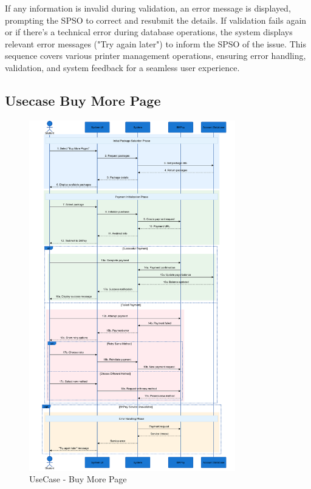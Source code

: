 If any information is invalid during validation, an error message is displayed, prompting the SPSO to correct and resubmit the details. If validation fails again or if there's a technical error during database operations, the system displays relevant error messages ("Try again later") to inform the SPSO of the issue. This sequence covers various printer management operations, ensuring error handling, validation, and system feedback for a seamless user experience.


\subsection{Usecase Buy More Page}

\begin{figure}[H]
    \centering
    \includegraphics[width=0.8\textwidth]{images/sequence_diagram/Buy More Pages.png}
    \caption{UseCase - Buy More Page}
    \label{fig:buy_more_page}
\end{figure}

